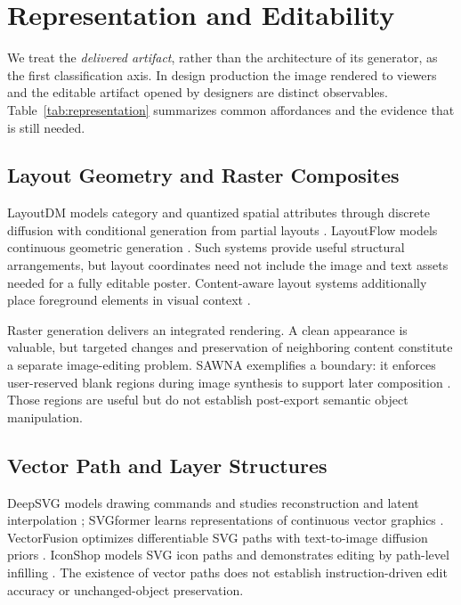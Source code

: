\section{Representation and Editability}
\label{sec:representation}
We treat the \emph{delivered artifact}, rather than the architecture of its generator, as the first classification axis. In design production the image rendered to viewers and the editable artifact opened by designers are distinct observables. Table~\ref{tab:representation} summarizes common affordances and the evidence that is still needed.



\subsection{Layout Geometry and Raster Composites}
LayoutDM models category and quantized spatial attributes through discrete diffusion with conditional generation from partial layouts \citep{layoutdm2023}. LayoutFlow models continuous geometric generation \citep{layoutflow2024}. Such systems provide useful structural arrangements, but layout coordinates need not include the image and text assets needed for a fully editable poster. Content-aware layout systems additionally place foreground elements in visual context \citep{cglgan2022,layoutdetr2024}.

Raster generation delivers an integrated rendering. A clean appearance is valuable, but targeted changes and preservation of neighboring content constitute a separate image-editing problem. SAWNA exemplifies a boundary: it enforces user-reserved blank regions during image synthesis to support later composition \citep{sawna2025}. Those regions are useful but do not establish post-export semantic object manipulation.

\subsection{Vector Path and Layer Structures}
DeepSVG models drawing commands and studies reconstruction and latent interpolation \citep{deepsvg2020}; SVGformer learns representations of continuous vector graphics \citep{svgformer2023}. VectorFusion optimizes differentiable SVG paths with text-to-image diffusion priors \citep{vectorfusion2023}. IconShop models SVG icon paths and demonstrates editing by path-level infilling \citep{iconshop2023}. The existence of vector paths does not establish instruction-driven edit accuracy or unchanged-object preservation.

